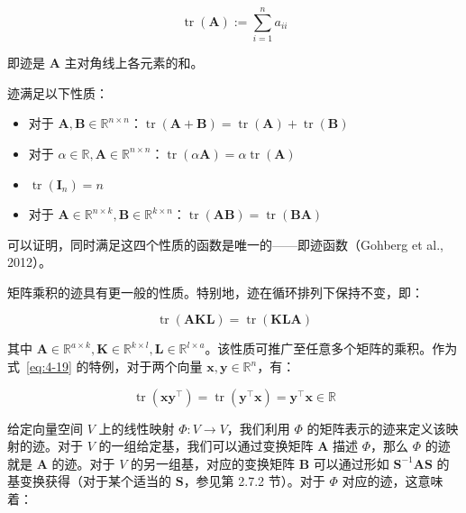 \begin{equation}
\operatorname{tr}(\boldsymbol{A}) := \sum_{i=1}^n a_{ii}
\tag{4.18}\label{eq:4-18}
\end{equation}

即迹是 $ \boldsymbol{A} $ 主对角线上各元素的和。

迹满足以下性质：

\begin{itemize}
\item 对于 $ \boldsymbol{A}, \boldsymbol{B} \in \mathbb{R}^{n \times n} $：$ \operatorname{tr}(\boldsymbol{A} + \boldsymbol{B}) = \operatorname{tr}(\boldsymbol{A}) + \operatorname{tr}(\boldsymbol{B}) $
\item 对于 $ \alpha \in \mathbb{R}, \boldsymbol{A} \in \mathbb{R}^{n \times n} $：$ \operatorname{tr}(\alpha \boldsymbol{A}) = \alpha \operatorname{tr}(\boldsymbol{A}) $
\item $ \operatorname{tr}(\boldsymbol{I}_n) = n $
\item 对于 $ \boldsymbol{A} \in \mathbb{R}^{n \times k}, \boldsymbol{B} \in \mathbb{R}^{k \times n} $：$ \operatorname{tr}(\boldsymbol{A} \boldsymbol{B}) = \operatorname{tr}(\boldsymbol{B} \boldsymbol{A}) $
\end{itemize}

可以证明，同时满足这四个性质的函数是唯一的——即迹函数（Gohberg et al., 2012）。

矩阵乘积的迹具有更一般的性质。特别地，迹在循环排列下保持不变，即：

\begin{equation}
\operatorname{tr}(\boldsymbol{A} \boldsymbol{K} \boldsymbol{L}) = \operatorname{tr}(\boldsymbol{K} \boldsymbol{L} \boldsymbol{A})
\tag{4.19}\label{eq:4-19}
\end{equation}

其中 $ \boldsymbol{A} \in \mathbb{R}^{a \times k}, \boldsymbol{K} \in \mathbb{R}^{k \times l}, \boldsymbol{L} \in \mathbb{R}^{l \times a} $。该性质可推广至任意多个矩阵的乘积。作为式~\eqref{eq:4-19} 的特例，对于两个向量 $ \boldsymbol{x}, \boldsymbol{y} \in \mathbb{R}^n $，有：

\begin{equation}
\operatorname{tr}(\boldsymbol{x} \boldsymbol{y}^\top) = \operatorname{tr}(\boldsymbol{y}^\top \boldsymbol{x}) = \boldsymbol{y}^\top \boldsymbol{x} \in \mathbb{R}
\tag{4.20}\label{eq:4-20}
\end{equation}

给定向量空间 $ V $ 上的线性映射 $ \Phi : V \to V $，我们利用 $ \Phi $ 的矩阵表示的迹来定义该映射的迹。对于 $ V $ 的一组给定基，我们可以通过变换矩阵 $ \boldsymbol{A} $ 描述 $ \Phi $，那么 $ \Phi $ 的迹就是 $ \boldsymbol{A} $ 的迹。对于 $ V $ 的另一组基，对应的变换矩阵 $ \boldsymbol{B} $ 可以通过形如 $ \boldsymbol{S}^{-1}\boldsymbol{A}\boldsymbol{S} $ 的基变换获得（对于某个适当的 $ \boldsymbol{S} $，参见第 2.7.2 节）。对于 $ \Phi $ 对应的迹，这意味着：

